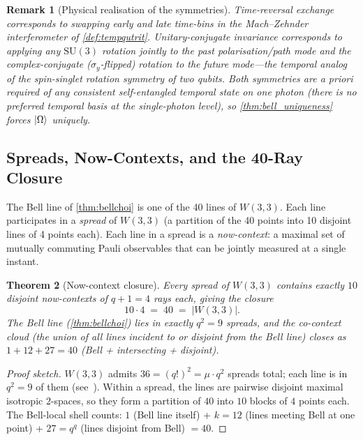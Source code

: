 ﻿\documentclass[12pt]{article}
\newtheorem{theorem}{Theorem}[section]
\newtheorem{remark}[theorem]{Remark}
\begin{document}
\begin{remark}[Physical realisation of the symmetries]\label{rem:phys_sym}
Time-reversal exchange corresponds to swapping early and late time-bins in the
Mach--Zehnder interferometer of \cref{def:tempqutrit}.  Unitary-conjugate
invariance corresponds to applying any $\mathrm{SU}(3)$ rotation jointly to the
past polarisation/path mode and the complex-conjugate ($\sigma_y$-flipped)
rotation to the future mode---the temporal analog of the spin-singlet rotation
symmetry of two qubits.  Both symmetries are \emph{a priori} required of any
consistent self-entangled temporal state on one photon (there is no preferred
temporal basis at the single-photon level), so \cref{thm:bell_uniqueness} forces
$\ket{\Omega}$ uniquely.
\end{remark}

\subsection{Spreads, Now-Contexts, and the 40-Ray Closure}

The Bell line of \cref{thm:bellchoi} is one of the 40 lines of $W(3,3)$.  Each line
participates in a \emph{spread} of $W(3,3)$ (a partition of the 40 points into
10 disjoint lines of 4 points each).  Each line in a spread is a
\emph{now-context}: a maximal set of mutually commuting Pauli observables that can
be jointly measured at a single instant.

\begin{theorem}[Now-context closure]\label{thm:nowclosure}
Every spread of $W(3,3)$ contains exactly $10$ disjoint now-contexts of $q+1=4$
rays each, giving the closure
\begin{equation}
  10 \cdot 4 \;=\; 40 \;=\; |W(3,3)|.
\end{equation}
The Bell line (\cref{thm:bellchoi}) lies in exactly $q^2 = 9$ spreads, and the
co-context cloud (the union of all lines incident to or disjoint from the Bell
line) closes as $1 + 12 + 27 = 40$ (Bell + intersecting + disjoint).
\end{theorem}

\begin{proof}[Proof sketch]
$W(3,3)$ admits $36 = (q!)^2 = \mu\cdot q^2$ spreads total; each line is in $q^2 = 9$ of them
(see~\cite{Vlasov2025}).  Within a spread, the lines are pairwise disjoint
maximal isotropic 2-spaces, so they form a partition of $40$ into $10$ blocks of
$4$ points each.  The Bell-local shell counts: $1$ (Bell line itself) +
$k = 12$ (lines meeting Bell at one point) + $27 = q^q$ (lines disjoint from Bell)
$= 40$.
\end{proof}
\end{document}
